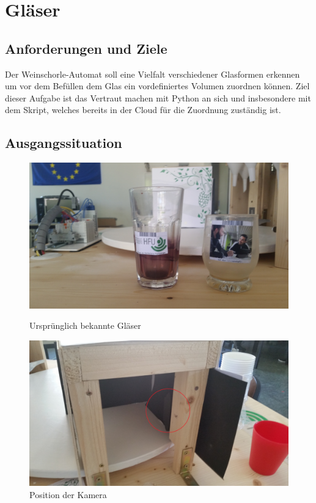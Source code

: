 \chapter{Gläser}
\section{Anforderungen und Ziele}
Der Weinschorle-Automat soll eine Vielfalt verschiedener Glasformen erkennen um vor dem Befüllen dem Glas ein vordefiniertes Volumen zuordnen können. Ziel dieser Aufgabe ist das Vertraut machen mit Python an sich und insbesondere mit dem Skript, welches bereits in der Cloud für die Zuordnung zuständig ist.

\section{Ausgangssituation}
\begin{figure}
	\centering
	\includegraphics[width=\linewidth]{content/pictures/urspruengliche_glaeser}
	\caption{Ursprünglich bekannte Gläser}
	\label{fig:urspruengliche_glaeser}
	
	\centering
	\includegraphics[width=\linewidth]{content/pictures/position_der_kamera}
	\caption{Position der Kamera}
	\label{fig:kamera_position}
\end{figure}

